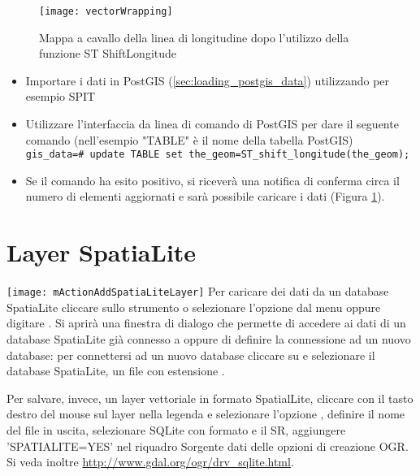\begin{figure}[ht]
   \centering
   \texttt{[image: vectorWrapping]}
   \caption{Mappa a cavallo della linea di longitudine  dopo l'utilizzo della funzione ST\textunderscore 
   Shift\textunderscore Longitude \nixcaption}
\label{fig:vector_wrapping}
\end{figure}


\begin{itemize}[label=--]
\item Importare i dati in PostGIS (\ref{sec:loading_postgis_data}) utilizzando 
per esempio SPIT
\item Utilizzare l'interfaccia da linea di comando di PostGIS per dare il seguente comando
(nell'esempio "TABLE" è il nome della tabella PostGIS) \\
\texttt{gis\_data=\# update TABLE set the\_geom=ST\_shift\_longitude(the\_geom);}
\item Se il comando ha esito positivo, si riceverà una notifica di conferma circa il 
numero di elementi aggiornati e sarà possibile caricare i dati (Figura \ref{fig:vector_wrapping}).
\end{itemize}

\section{Layer SpatiaLite}
\label{label_spatialite}

\texttt{[image: mActionAddSpatiaLiteLayer]}
Per caricare dei dati da un database SpatiaLite cliccare sullo strumento 
 o selezionare 
l'opzione  
dal menu  oppure digitare .
Si aprirà una finestra di dialogo che permette di accedere ai dati di un database 
SpatiaLite già connesso a \qg oppure di definire la connessione ad un nuovo 
database: per connettersi ad un nuovo database cliccare su  e selezionare 
il database SpatiaLite, un file con estensione .

Per salvare, invece, un layer vettoriale in formato SpatialLite, cliccare con il tasto 
destro del mouse sul layer nella legenda e selezionare l'opzione , 
definire il nome del file in uscita, selezionare SQLite con formato e il SR, aggiungere 
'SPATIALITE=YES' nel riquadro Sorgente dati delle opzioni di creazione OGR. Si veda inoltre
\url{http://www.gdal.org/ogr/drv_sqlite.html}.

